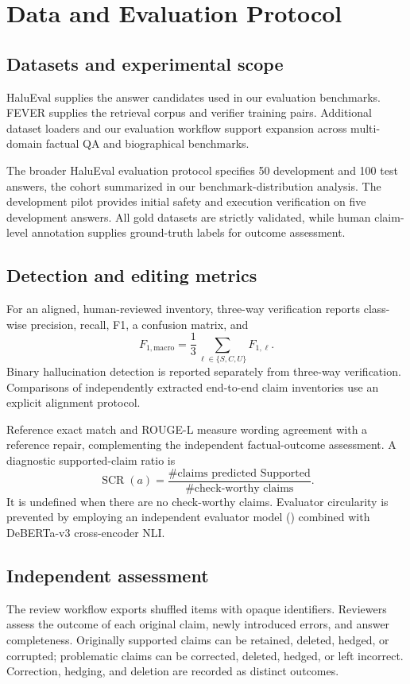 \documentclass[11pt,a4paper]{article}
\newcommand{\code}[1]{\texttt{\detokenize{#1}}}
\begin{document}
\section{Data and Evaluation Protocol}
\subsection{Datasets and experimental scope}
HaluEval supplies the answer candidates used in our evaluation benchmarks. FEVER supplies the retrieval corpus and verifier training pairs. Additional dataset loaders and our evaluation workflow support expansion across multi-domain factual QA and biographical benchmarks.

The broader HaluEval evaluation protocol specifies 50 development and 100 test answers, the cohort summarized in our benchmark-distribution analysis. The development pilot provides initial safety and execution verification on five development answers. All gold datasets are strictly validated, while human claim-level annotation supplies ground-truth labels for outcome assessment.

\subsection{Detection and editing metrics}
For an aligned, human-reviewed inventory, three-way verification reports class-wise precision, recall, F1, a confusion matrix, and
\[
 F_{1,\mathrm{macro}}=\frac{1}{3}\sum_{\ell\in\{S,C,U\}}F_{1,\ell}.
\]
Binary hallucination detection is reported separately from three-way verification. Comparisons of independently extracted end-to-end claim inventories use an explicit alignment protocol.

Reference exact match and ROUGE-L measure wording agreement with a reference repair, complementing the independent factual-outcome assessment. A diagnostic supported-claim ratio is
\[
 \operatorname{SCR}(a)=\frac{\#\text{claims predicted Supported}}{\#\text{check-worthy claims}}.
\]
It is undefined when there are no check-worthy claims. Evaluator circularity is prevented by employing an independent evaluator model (\code{gemma2-9b-it}) combined with DeBERTa-v3 cross-encoder NLI.

\subsection{Independent assessment}
The review workflow exports shuffled items with opaque identifiers. Reviewers assess the outcome of each original claim, newly introduced errors, and answer completeness. Originally supported claims can be retained, deleted, hedged, or corrupted; problematic claims can be corrected, deleted, hedged, or left incorrect. Correction, hedging, and deletion are recorded as distinct outcomes.
\end{document}

